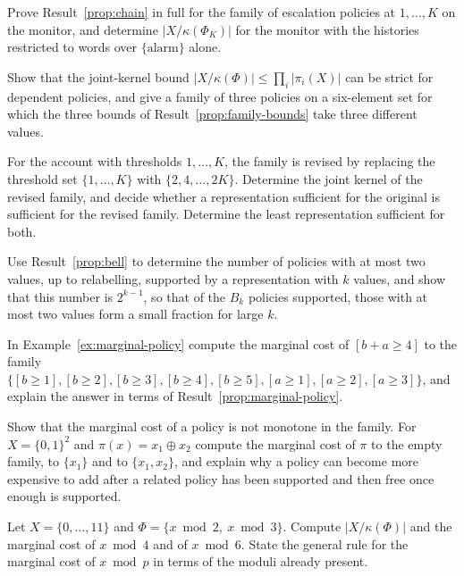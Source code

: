 \begin{exercise}
Prove Result~\ref{prop:chain} in full for the family of escalation policies at $1,\dots,K$ on the monitor, and determine $|X/\kappa(\Phi_K)|$ for the monitor with the histories restricted to words over $\{\mathrm{alarm}\}$ alone.
\end{exercise}

\begin{exercise}
Show that the joint-kernel bound $|X/\kappa(\Phi)|\le\prod_i|\pi_i(X)|$ can be strict for dependent policies, and give a family of three policies on a six-element set for which the three bounds of Result~\ref{prop:family-bounds} take three different values.
\end{exercise}

\begin{exercise}
For the account with thresholds $1,\dots,K$, the family is revised by replacing the threshold set $\{1,\dots,K\}$ with $\{2,4,\dots,2K\}$. Determine the joint kernel of the revised family, and decide whether a representation sufficient for the original is sufficient for the revised family. Determine the least representation sufficient for both.
\end{exercise}

\begin{exercise}
Use Result~\ref{prop:bell} to determine the number of policies with at most two values, up to relabelling, supported by a representation with $k$ values, and show that this number is $2^{k-1}$, so that of the $B_k$ policies supported, those with at most two values form a small fraction for large $k$.
\end{exercise}


\begin{exercise}
In Example~\ref{ex:marginal-policy} compute the marginal cost of $[b+a\ge4]$ to the family $\{[b\ge1],[b\ge2],[b\ge3],[b\ge4],[b\ge5],[a\ge1],[a\ge2],[a\ge3]\}$, and explain the answer in terms of Result~\ref{prop:marginal-policy}.\label{ex:marg-sum}
\end{exercise}

\begin{exercise}
Show that the marginal cost of a policy is not monotone in the family. For $X=\{0,1\}^{2}$ and $\pi(x)=x_1\oplus x_2$ compute the marginal cost of $\pi$ to the empty family, to $\{x_1\}$ and to $\{x_1,x_2\}$, and explain why a policy can become more expensive to add after a related policy has been supported and then free once enough is supported.\end{exercise}

\begin{exercise}
Let $X=\{0,\dots,11\}$ and $\Phi=\{x\bmod 2,\ x\bmod 3\}$. Compute $|X/\kappa(\Phi)|$ and the marginal cost of $x\bmod 4$ and of $x\bmod 6$. State the general rule for the marginal cost of $x\bmod p$ in terms of the moduli already present.\label{ex:mod-marg}
\end{exercise}

